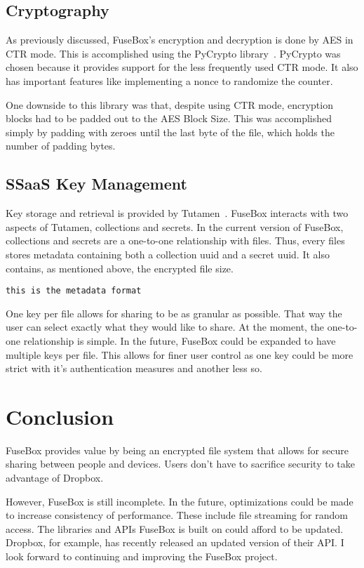 \documentclass[11pt,twocolumn,letterpaper]{article}
\newcommand{\appname}{FuseBox }
\newcommand{\appnameWOspace}{FuseBox}
\newcommand{\custosWOspace}{Tutamen}
\begin{document}
\subsection{Cryptography}
\label{sec:encimp}
As previously discussed, \appnameWOspace's encryption and decryption
is done by AES in CTR mode. This is accomplished using the  PyCrypto
library~\cite{pycrypto}.
PyCrypto was chosen because it provides support for the less
frequently used CTR
mode. It also has important features like implementing a nonce to
randomize the counter. 
\par One downside to this library was that, despite using CTR mode,
encryption blocks had to be padded out to the AES Block Size. This was
accomplished simply by padding with zeroes until the last byte of the
file, which holds the number of padding bytes.  

\subsection{SSaaS Key Management}
\label{sec:ksimp}
Key storage and retrieval is provided
by \custosWOspace~\cite{Pytutamen}. \appname interacts with two aspects
of \custosWOspace, collections and secrets. In the current version
of \appnameWOspace, collections and secrets are a one-to-one
relationship with files. Thus, every files stores metadata containing
both a collection uuid and a secret uuid. It also contains, as
mentioned above, the encrypted file size.

\texttt{this is the metadata format}

\par One key per file allows for sharing to be as granular as
possible. That way the user can select exactly what they would like to share.
At the moment, the one-to-one relationship is simple. In the future, \appname
could be expanded to have multiple keys per file. This allows for
finer user control as one key could be more strict with it's
authentication measures and another less so.   

\section{Conclusion}
\label{sec:conclusion}
\appname provides value by being an encrypted file
system that allows for secure sharing between people and devices.
Users don't have to sacrifice security to take advantage of Dropbox. 
\par However, \appname is still incomplete. In the future, optimizations
could be made to increase consistency of performance. These include
file streaming for random access. The libraries and APIs \appname is
built on could afford to be updated. Dropbox, for example, has recently released an
updated version of their API. I look forward to continuing and
improving the \appname project.    



\end{document}
